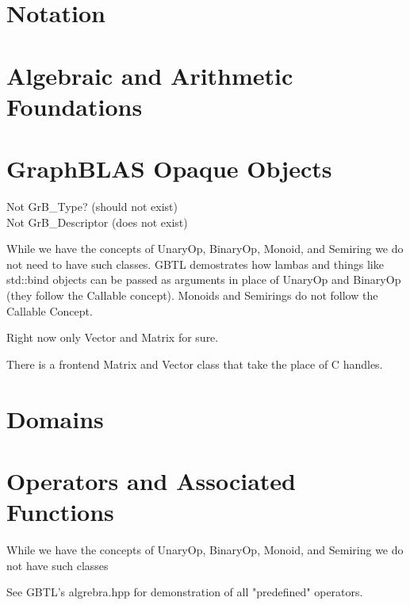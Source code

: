 \section{Notation}


\section{Algebraic and Arithmetic Foundations}


\section{GraphBLAS Opaque Objects}

Not GrB\_Type? (should not exist)\\
Not GrB\_Descriptor (does not exist)

While we have the concepts of UnaryOp, BinaryOp, Monoid, and Semiring we 
do not need to have such classes.  GBTL demostrates how lambas and things 
like std::bind objects can be passed as arguments in place of UnaryOp and
BinaryOp (they follow the Callable concept).  Monoids and Semirings do not 
follow the Callable Concept.

Right now only Vector and Matrix for sure.

There is a frontend Matrix and Vector class that take the place of C handles.

\section{Domains}


\section{Operators and Associated Functions}

While we have the concepts of UnaryOp, BinaryOp, Monoid, and Semiring we do not have such classes

See GBTL's {\sf algrebra.hpp} for demonstration of all "predefined" operators.


